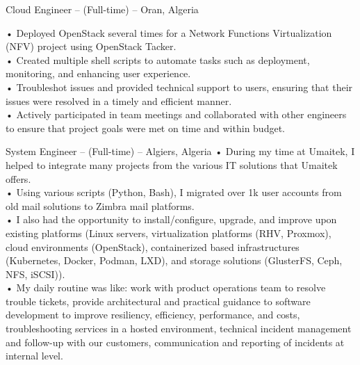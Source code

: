 \documentclass{cv}
\begin{document}
{    %
}
{Cloud Engineer -- (Full-time)}
{\lab -- Oran, Algeria\vspace{.3cm}}
{
  • Deployed OpenStack several times for a Network Functions Virtualization (NFV) project using OpenStack Tacker.\\
  • Created multiple shell scripts to automate tasks such as deployment, monitoring, and enhancing user experience.\\
  • Troubleshot issues and provided technical support to users, ensuring that their issues were resolved in a timely and efficient manner.\\
  • Actively participated in team meetings and collaborated with other engineers to ensure that project goals were met on time and within budget.

}
{System Engineer -- (Full-time)}
{\umtk -- Algiers, Algeria\vspace{.3cm}}
{
  • During my time at Umaitek, I helped to integrate many projects from the various IT solutions that Umaitek offers.\\
  • Using various scripts (Python, Bash), I migrated over 1k user accounts from old mail solutions to Zimbra mail platforms.\\
  • I also had the opportunity to install/configure, upgrade, and improve upon existing platforms (Linux servers, virtualization platforms (RHV, Proxmox), 
    cloud environments (OpenStack), containerized based infrastructures (Kubernetes, Docker, Podman, LXD), and storage solutions (GlusterFS, Ceph, NFS, iSCSI)).\\
  • My daily routine was like: work with product operations team to resolve trouble tickets, provide architectural and practical guidance to software development to improve resiliency, efficiency, performance, and costs, troubleshooting services in a hosted environment, technical incident management and follow-up with our customers,
  communication and reporting of incidents at internal level.\\

}
\end{document}
